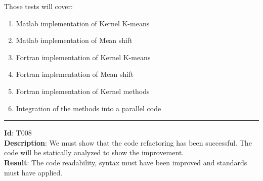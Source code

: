 Those tests will cover:
\begin{enumerate}
\item Matlab implementation of Kernel K-means
\item Matlab implementation of Mean shift
\item Fortran implementation of Kernel K-means
\item Fortran implementation of Mean shift
\item Fortran implementation of Kernel methods
\item Integration of the methods into a parallel code\\
\end{enumerate}
\hrule
\vspace{0.2cm}
\textbf{Id}: T008\\

\textbf{Description}: We must show that the code refactoring has been successful. The code will be statically analyzed to show the improvement.\\ 

\textbf{Result}: The code readability, syntax must have been improved and standards must have applied.

